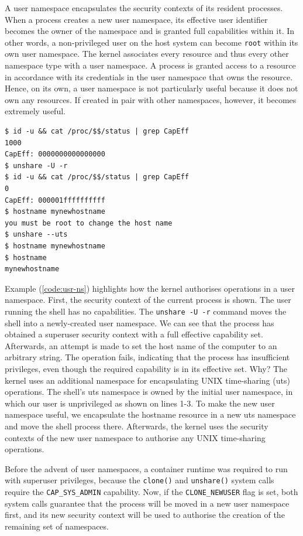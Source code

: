 A user namespace encapsulates the security contexts of its resident processes. 
When a process creates a new user namespace, its effective user identifier
becomes the owner of the namespace and is granted full capabilities within it.
In other words, a non-privileged user on the host system can become \verb|root| within its own 
user namespace.
The kernel associates every resource and thus every other namespace type 
with a user namespace. A process is granted access to a resource in accordance with its 
credentials in the user namespace that owns the resource. 
Hence, on its own, a user namespace is not particularly useful because it does not 
own any resources. If created in pair with other namespaces, however, it becomes 
extremely useful.
\begin{lstlisting}[label={code:usr-ns}, style=bash, caption={Example of resource ownership semantics with user namespaces}]
$ id -u && cat /proc/$$/status | grep CapEff
1000
CapEff:	0000000000000000
$ unshare -U -r  
$ id -u && cat /proc/$$/status | grep CapEff
0
CapEff:	000001ffffffffff
$ hostname mynewhostname
you must be root to change the host name
$ unshare --uts
$ hostname mynewhostname
$ hostname 
mynewhostname 
\end{lstlisting}
Example (\ref{code:usr-ns}) highlights how the kernel authorises operations in a user namespace.
First, the security context of the current process is shown. The user running the shell has no capabilities. 
The \verb|unshare -U -r| command moves the shell into a newly-created user namespace. 
We can see that the process has obtained a superuser security context with a full effective 
capability set. Afterwards, an attempt is made to set the host name of the computer to an arbitrary string.
The operation fails, indicating that the process has insufficient privileges, even though the required 
capability is in its effective set. Why? The kernel uses an additional namespace for 
encapsulating UNIX time-sharing (uts) operations. The shell's uts namespace is owned by 
the initial user namespace, in which our user is unprivileged as shown on lines 1-3. 
To make the new user namespace useful, we encapsulate the hostname resource in a new uts namespace 
and move the shell process there. Afterwards, the kernel uses the security contexts of the new  
user namespace to authorise any UNIX time-sharing operations.

Before the advent of user namespaces,
a container runtime was required to run with superuser privileges,  
because the \verb|clone()| and \verb|unshare()| system calls require the \verb|CAP_SYS_ADMIN| 
capability. Now, if the \verb|CLONE_NEWUSER| flag is set, both system calls guarantee that the 
process will be moved in a new user namespace first, and its new security context will be used 
to authorise the creation of the remaining set of namespaces.

